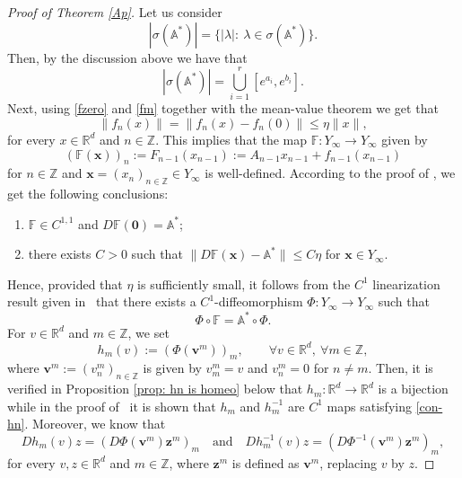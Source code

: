 \documentclass[reqno, a4paper, 10pt]{amsart}
\theoremstyle{plain}
\numberwithin{equation}{section}
\theoremstyle{remark}
\def\R{\mathbb{R}}
\def\Z{\mathbb{Z}}
\begin{document}
\begin{proof}[Proof of Theorem \ref{Ap}]
Let us consider
\[
|\sigma(\mathbb A^\ast)|=\{ |\lambda|: \ \lambda \in \sigma(\mathbb A^\ast)\}.
\]
Then, by the discussion above we have that
\[
|\sigma(\mathbb A^\ast)|=\bigcup_{i=1}^r [e^{a_i}, e^{b_i}].
\]
Next, using \eqref{fzero} and \eqref{fm} together with the mean-value theorem we get that 
\[
\|f_n(x)\|=\|f_n(x)-f_n(0)\|\le \eta \|x\|,
\]
for every $x\in \mathbb R^d$ and $n\in \mathbb Z$. This implies that the map $\mathbb F\colon Y_\infty \to Y_\infty$ given by
\begin{equation}\label{eq: def F lifting}
(\mathbb F(\mathbf x))_n:=F_{n-1}(x_{n-1}):= A_{n-1}x_{n-1}+f_{n-1}(x_{n-1})
\end{equation}
for $n\in \Z$ and $\mathbf x=(x_n)_{n\in \Z}\in Y_\infty$ is well-defined. According to the proof of \cite[Theorem 2]{DZZ}, we get the following conclusions:
\begin{enumerate}[label={(C\arabic*)},ref=C\arabic*]
\item \label{Df 0 is A} $\mathbb F\in C^{1,1}$ and $D \mathbb F(\mathbf 0)=\mathbb A^\ast$;
\item \label{Df x close A} there exists $C>0$ such that $\| D\mathbb F(\mathbf x)-\mathbb A^\ast\| \le C\eta$ for $\mathbf x\in Y_\infty$.
\end{enumerate}
Hence, provided that $\eta$ is sufficiently small, it follows from the $C^1$ linearization result given in~\cite[Appendix]{DZZ} that there exists a $C^1$-diffeomorphism  $\Phi \colon Y_\infty \to Y_\infty$ such that
\begin{equation}\label{P}
\Phi \circ \mathbb F=\mathbb A^\ast\circ \Phi.
\end{equation}
For $v\in \R^d$ and $m\in \Z$, we set
\begin{equation}\label{eq: def hn}
h_m(v):=(\Phi(\mathbf v^m))_m,\qquad \forall v\in \mathbb{R}^d,~\forall m\in\mathbb{Z},
\end{equation}
where $\mathbf v^m:=(v_n^m)_{n\in \Z}$ is given by $v_m^m=v$ and $v_n^m=0$ for $n\neq m$. Then, it is verified in Proposition \ref{prop: hn is homeo} below that $h_m\colon \R^d \to \R^d$ is a bijection while in the proof of~\cite[Theorem 2]{DZZ} it is shown that $h_m$ and $h_m ^{-1}$ are $C^1$ maps satisfying \eqref{con-hn}.
Moreover, we know that
\begin{equation}\label{DhDPhi}
  D h_m(v) z=(D\Phi(\mathbf v^m)\mathbf z^m)_m \quad \text{and} \quad Dh_m^{-1}(v)z=(D\Phi^{-1}(\mathbf v^m)\mathbf z^m)_m,
\end{equation}
for every $v, z\in \R^d$ and $m\in \Z$, 
where $\mathbf z^m$ is defined as $\mathbf v^m$, replacing $v$ by $z$.


\end{proof}
\end{document}
